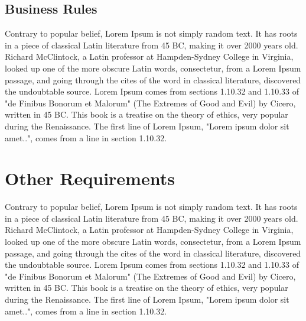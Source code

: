 \documentclass{scrreprt}
\begin{document}
    \section{Business Rules} 
    Contrary to popular belief, Lorem Ipsum is not simply random text. It has roots in a piece of classical Latin literature from 45 BC, making it over 2000 years old. Richard McClintock, a Latin professor at Hampden-Sydney College in Virginia, looked up one of the more obscure Latin words, consectetur, from a Lorem Ipsum passage, and going through the cites of the word in classical literature, discovered the undoubtable source. Lorem Ipsum comes from sections 1.10.32 and 1.10.33 of "de Finibus Bonorum et Malorum" (The Extremes of Good and Evil) by Cicero, written in 45 BC. This book is a treatise on the theory of ethics, very popular during the Renaissance. The first line of Lorem Ipsum, "Lorem ipsum dolor sit amet..", comes from a line in section 1.10.32.

    \chapter{Other Requirements}
    Contrary to popular belief, Lorem Ipsum is not simply random text. It has roots in a piece of classical Latin literature from 45 BC, making it over 2000 years old. Richard McClintock, a Latin professor at Hampden-Sydney College in Virginia, looked up one of the more obscure Latin words, consectetur, from a Lorem Ipsum passage, and going through the cites of the word in classical literature, discovered the undoubtable source. Lorem Ipsum comes from sections 1.10.32 and 1.10.33 of "de Finibus Bonorum et Malorum" (The Extremes of Good and Evil) by Cicero, written in 45 BC. This book is a treatise on the theory of ethics, very popular during the Renaissance. The first line of Lorem Ipsum, "Lorem ipsum dolor sit amet..", comes from a line in section 1.10.32.


    
\end{document}
